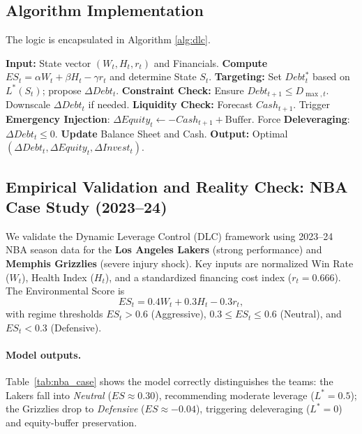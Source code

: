 \documentclass{mcmthesis}
\begin{document}
\subsection{Algorithm Implementation}
The logic is encapsulated in Algorithm \ref{alg:dlc}.

\begin{algorithm}[H]
\caption{Dynamic Leverage Control (DLC)}
\label{alg:dlc}
\begin{algorithmic}[1]
\State \textbf{Input:} State vector $(W_t, H_t, r_t)$ and Financials.
\State \textbf{Compute} $ES_t = \alpha W_t + \beta H_t - \gamma r_t$ and determine State $S_t$.
\State \textbf{Targeting:} Set $Debt^*_t$ based on $L^*(S_t)$; propose $\Delta Debt_t$.
\State \textbf{Constraint Check:} Ensure $Debt_{t+1} \le D_{\max,t}$. Downscale $\Delta Debt_t$ if needed.
\State \textbf{Liquidity Check:} Forecast $Cash_{t+1}$.
    \State Trigger \textbf{Emergency Injection}: $\Delta Equity_t \gets -Cash_{t+1} + \text{Buffer}$.
    \State Force \textbf{Deleveraging}: $\Delta Debt_t \le 0$.
\EndIf
\State \textbf{Update} Balance Sheet and Cash.
\State \textbf{Output:} Optimal $(\Delta Debt_t, \Delta Equity_t, \Delta Invest_t)$.
\end{algorithmic}
\end{algorithm}

\subsection{Empirical Validation and Reality Check: NBA Case Study (2023--24)}
\label{subsec:nba_empirical_reality_check}

We validate the Dynamic Leverage Control (DLC) framework using 2023--24 NBA season data for the \textbf{Los Angeles Lakers} (strong performance) and \textbf{Memphis Grizzlies} (severe injury shock). Key inputs are normalized Win Rate ($W_t$), Health Index ($H_t$), and a standardized financing cost index ($r_t = 0.666$). The Environmental Score is
\[
ES_t = 0.4 W_t + 0.3 H_t - 0.3 r_t,
\]
with regime thresholds $ES_t > 0.6$ (Aggressive), $0.3 \leq ES_t \leq 0.6$ (Neutral), and $ES_t < 0.3$ (Defensive).

\paragraph{Model outputs.}
Table~\ref{tab:nba_case} shows the model correctly distinguishes the teams: the Lakers fall into \textit{Neutral} ($ES \approx 0.30$), recommending moderate leverage ($L^* = 0.5$); the Grizzlies drop to \textit{Defensive} ($ES \approx -0.04$), triggering deleveraging ($L^* = 0$) and equity-buffer preservation.
\end{document}
